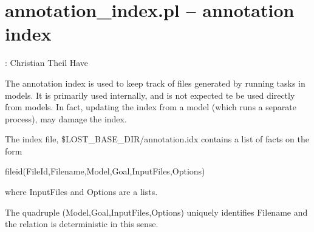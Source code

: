 


\section{annotation_index.pl -- annotation index}

\label{sec:annotationindex}

\begin{tags}
: Christian Theil Have
\end{tags}

The annotation index is used to keep track of files generated by running tasks in models.
It is primarily used internally, and is not expected te be used directly from models.
In fact, updating the index from a model (which runs a separate process), may damage the index.

The index file, \$LOST_BASE_DIR/annotation.idx contains a list of facts on the form

\begin{code}
fileid(FileId,Filename,Model,Goal,InputFiles,Options)
\end{code}

where InputFiles and Options are a lists.

The quadruple (Model,Goal,InputFiles,Options) uniquely identifies Filename and the relation is
deterministic in this sense.\vspace{0.7cm}

